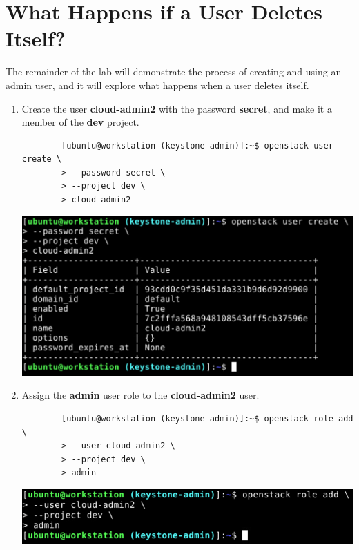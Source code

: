 \documentclass[letterpaper, 12pt]{article}
\begin{document}
\appendix
\section{What Happens if a User Deletes Itself?}
The remainder of the lab will demonstrate the process of creating and using an admin user, and it will explore what happens when a user deletes itself.

\begin{enumerate}
    \item Create the user \textbf{cloud-admin2} with the password \textbf{secret}, and make it a member of the
    \textbf{dev} project.
    \begin{lstlisting}
        [ubuntu@workstation (keystone-admin)]:~$ openstack user create \
        > --password secret \
        > --project dev \
        > cloud-admin2
    \end{lstlisting}

    \begin{center}
        \includegraphics[width=\linewidth]{images/appendix/step1.png}
    \end{center}

    \item Assign the \textbf{admin} user role to the \textbf{cloud-admin2} user.
    \begin{lstlisting}
        [ubuntu@workstation (keystone-admin)]:~$ openstack role add \
        > --user cloud-admin2 \
        > --project dev \
        > admin
    \end{lstlisting}

    \begin{center}
        \includegraphics[width=\linewidth]{images/appendix/step2.png}
    \end{center}


\end{enumerate}
\end{document}
